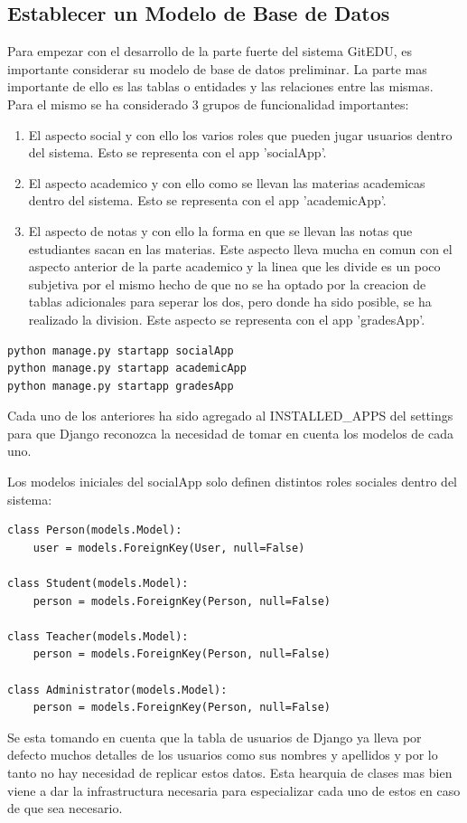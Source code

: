 \subsection{Establecer un Modelo de Base de Datos}
Para empezar con el desarrollo de la parte fuerte del sistema GitEDU, es importante considerar su modelo de base de datos preliminar. La parte mas importante de ello es las tablas o entidades y las relaciones entre las mismas. Para el mismo se ha considerado 3 grupos de funcionalidad importantes:
\begin{enumerate}
	\item El aspecto social y con ello los varios roles que pueden jugar usuarios dentro del sistema. Esto se representa con el app 'socialApp'.
    \item El aspecto academico y con ello como se llevan las materias academicas dentro del sistema. Esto se representa con el app 'academicApp'.
    \item El aspecto de notas y con ello la forma en que se llevan las notas que estudiantes sacan en las materias. Este aspecto lleva mucha en comun con el aspecto anterior de la parte academico y la linea que les divide es un poco subjetiva por el mismo hecho de que no se ha optado por la creacion de tablas adicionales para seperar los dos, pero donde ha sido posible, se ha realizado la division. Este aspecto se representa con el app 'gradesApp'. 
\end{enumerate}

\begin{lstlisting}
python manage.py startapp socialApp
python manage.py startapp academicApp
python manage.py startapp gradesApp
\end{lstlisting}

Cada uno de los anteriores ha sido agregado al INSTALLED\_APPS del settings para que Django reconozca la necesidad de tomar en cuenta los modelos de cada uno.

Los modelos iniciales del socialApp solo definen distintos roles sociales dentro del sistema:
\lstset{language=Python}
\begin{lstlisting}
class Person(models.Model):
    user = models.ForeignKey(User, null=False)

class Student(models.Model):
    person = models.ForeignKey(Person, null=False)

class Teacher(models.Model):
    person = models.ForeignKey(Person, null=False)

class Administrator(models.Model):
    person = models.ForeignKey(Person, null=False)
\end{lstlisting}
\lstset{language=Bash}
Se esta tomando en cuenta que la tabla de usuarios de Django ya lleva por defecto muchos detalles de los usuarios como sus nombres y apellidos y por lo tanto no hay necesidad de replicar estos datos. Esta hearquia de clases mas bien viene a dar la infrastructura necesaria para especializar cada uno de estos en caso de que sea necesario.

